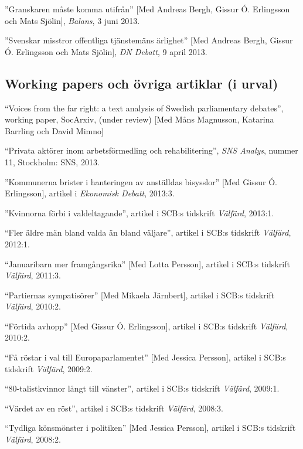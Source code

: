 \documentclass[11pt,]{article}
\begin{document}
''Granskaren måste komma utifrån'' {[}Med Andreas Bergh, Gissur Ó.
Erlingsson och Mats Sjölin{]}, \emph{Balans}, 3 juni 2013.

''Svenskar misstror offentliga tjänstemäns ärlighet'' {[}Med Andreas
Bergh, Gissur Ó. Erlingsson och Mats Sjölin{]}, \emph{DN Debatt}, 9
april 2013.

\hypertarget{working-papers-och-ovriga-artiklar-i-urval}{%
\subsection{\texorpdfstring{\textbf{Working papers och övriga artiklar
(i
urval)}}{Working papers och övriga artiklar (i urval)}}\label{working-papers-och-ovriga-artiklar-i-urval}}

``Voices from the far right: a text analysis of Swedish parliamentary
debates'', working paper, SocArxiv, (under review) {[}Med Måns
Magnusson, Katarina Barrling och David Mimno{]}

``Privata aktörer inom arbetsförmedling och rehabilitering'', \emph{SNS
Analys}, nummer 11, Stockholm: SNS, 2013.

''Kommunerna brister i hanteringen av anställdas bisysslor'' {[}Med
Gissur Ó. Erlingsson{]}, artikel i \emph{Ekonomisk Debatt}, 2013:3.

''Kvinnorna förbi i valdeltagande'', artikel i SCB:s tidskrift
\emph{Välfärd}, 2013:1.

``Fler äldre män bland valda än bland väljare'', artikel i SCB:s
tidskrift \emph{Välfärd}, 2012:1.

``Januaribarn mer framgångsrika'' {[}Med Lotta Persson{]}, artikel i
SCB:s tidskrift \emph{Välfärd}, 2011:3.

``Partiernas sympatisörer'' {[}Med Mikaela Järnbert{]}, artikel i SCB:s
tidskrift \emph{Välfärd}, 2010:2.

``Förtida avhopp'' {[}Med Gissur Ó. Erlingsson{]}, artikel i SCB:s
tidskrift \emph{Välfärd}, 2010:2.

``Få röstar i val till Europaparlamentet'' {[}Med Jessica Persson{]},
artikel i SCB:s tidskrift \emph{Välfärd}, 2009:2.

``80-talistkvinnor långt till vänster'', artikel i SCB:s tidskrift
\emph{Välfärd}, 2009:1.

``Värdet av en röst'', artikel i SCB:s tidskrift \emph{Välfärd}, 2008:3.

``Tydliga könsmönster i politiken'' {[}Med Jessica Persson{]}, artikel i
SCB:s tidskrift \emph{Välfärd}, 2008:2.
\end{document}
